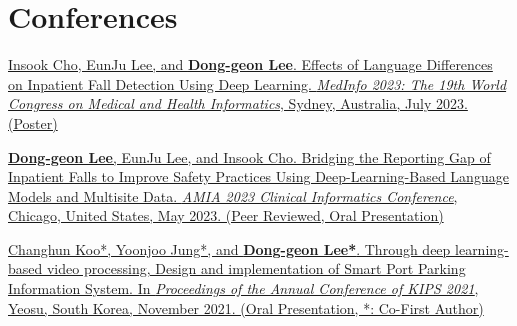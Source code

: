 \documentclass[letterpaper,11pt]{article}
\begin{document}
    \section{Conferences}
    \begin{enumerate}[noitemsep, leftmargin=*,label={[\arabic*]}]
        \item \href{https://bit.ly/medinfo2023poster}{Insook Cho, EunJu Lee, and \textbf{Dong-geon Lee}. Effects of Language Differences on Inpatient Fall Detection Using Deep Learning. \textit{MedInfo 2023: The 19th World Congress on Medical and Health Informatics}, Sydney, Australia, July 2023. (Poster)}
        
        \item \href{https://bit.ly/cic23abstract}{\textbf{Dong-geon Lee}, EunJu Lee, and Insook Cho. Bridging the Reporting Gap of Inpatient Falls to Improve Safety Practices Using Deep-Learning-Based Language Models and Multisite Data. \textit{AMIA 2023 Clinical Informatics Conference}, Chicago, United States, May 2023. (Peer Reviewed, Oral Presentation)}
        
        \item {\href{https://doi.org/10.3745/PKIPS.y2021m11a.1342}{Changhun Koo*, Yoonjoo Jung*, and \textbf{Dong-geon Lee*}. Through deep learning-based video processing, Design and implementation of Smart Port Parking Information System. In \textit{Proceedings of the Annual Conference of KIPS 2021}, Yeosu, South Korea, November 2021. (Oral Presentation, *: Co-First Author)}}
    \end{enumerate}


\end{document}
